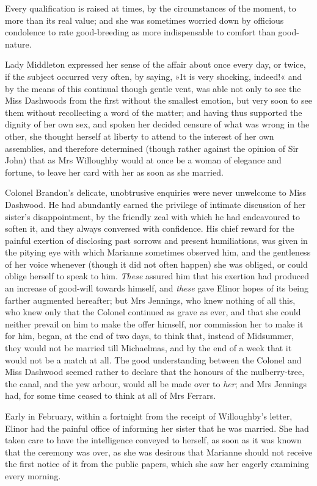 Every qualification is raised at times, by the circumstances of the moment, to more than its real value; and she was sometimes worried down by officious condolence to rate good-breeding as more indispensable to comfort than good-nature.

Lady Middleton expressed her sense of the affair about once every day, or twice, if the subject occurred very often, by saying, »It is very shocking, indeed!« and by the means of this continual though gentle vent, was able not only to see the Miss Dashwoods from the first without the smallest emotion, but very soon to see them without recollecting a word of the matter; and having thus supported the dignity of her own sex, and spoken her decided censure of what was wrong in the other, she thought herself at liberty to attend to the interest of her own assemblies, and therefore determined (though rather against the opinion of Sir John) that as Mrs Willoughby would at once be a woman of elegance and fortune, to leave her card with her as soon as she married.

Colonel Brandon’s delicate, unobtrusive enquiries were never unwelcome to Miss Dashwood. He had abundantly earned the privilege of intimate discussion of her sister’s disappointment, by the friendly zeal with which he had endeavoured to soften it, and they always conversed with confidence. His chief reward for the painful exertion of disclosing past sorrows and present humiliations, was given in the pitying eye with which Marianne sometimes observed him, and the gentleness of her voice whenever (though it did not often happen) she was obliged, or could oblige herself to speak to him. \textit{These} assured him that his exertion had produced an increase of good-will towards himself, and \textit{these} gave Elinor hopes of its being farther augmented hereafter; but Mrs Jennings, who knew nothing of all this, who knew only that the Colonel continued as grave as ever, and that she could neither prevail on him to make the offer himself, nor commission her to make it for him, began, at the end of two days, to think that, instead of Midsummer, they would not be married till Michaelmas, and by the end of a week that it would not be a match at all. The good understanding between the Colonel and Miss Dashwood seemed rather to declare that the honours of the mulberry-tree, the canal, and the yew arbour, would all be made over to \textit{her}; and Mrs Jennings had, for some time ceased to think at all of Mrs Ferrars.

Early in February, within a fortnight from the receipt of Willoughby’s letter, Elinor had the painful office of informing her sister that he was married. She had taken care to have the intelligence conveyed to herself, as soon as it was known that the ceremony was over, as she was desirous that Marianne should not receive the first notice of it from the public papers, which she saw her eagerly examining every morning.

